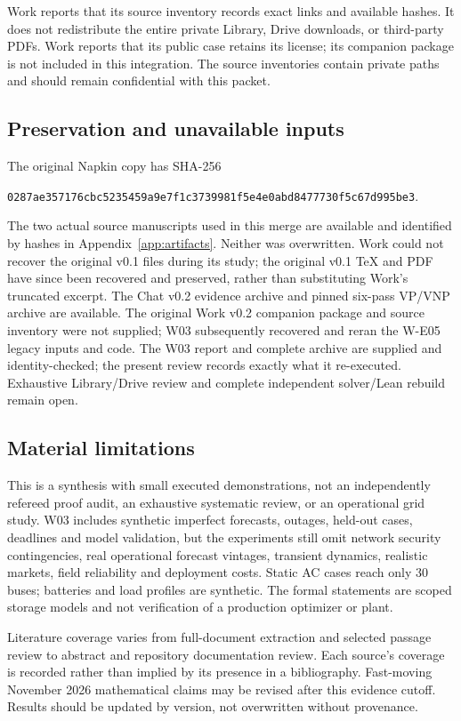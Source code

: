 \documentclass[11pt,letterpaper]{article}
\begin{document}
Work reports that its source inventory records exact links and available hashes. It does not redistribute the entire private Library, Drive downloads, or third-party PDFs. Work reports that its public case retains its license; its companion package is not included in this integration. The source inventories contain private paths and should remain confidential with this packet.

\subsection{Preservation and unavailable inputs}
The original Napkin copy has SHA-256\par\texttt{0287ae357176cbc5235459a9e7f1c37399}\newline\texttt{81f5e4e0abd8477730f5c67d995be3}.\par The two actual source manuscripts used in this merge are available and identified by hashes in Appendix~\ref{app:artifacts}. Neither was overwritten. Work could not recover the original v0.1 files during its study; the original v0.1 TeX and PDF have since been recovered and preserved, rather than substituting Work's truncated excerpt. The Chat v0.2 evidence archive and pinned six-pass VP/VNP archive are available. The original Work v0.2 companion package and source inventory were not supplied; W03 subsequently recovered and reran the W-E05 legacy inputs and code. The W03 report and complete archive are supplied and identity-checked; the present review records exactly what it re-executed. Exhaustive Library/Drive review and complete independent solver/Lean rebuild remain open.

\subsection{Material limitations}
This is a synthesis with small executed demonstrations, not an independently refereed proof audit, an exhaustive systematic review, or an operational grid study. W03 includes synthetic imperfect forecasts, outages, held-out cases, deadlines and model validation, but the experiments still omit network security contingencies, real operational forecast vintages, transient dynamics, realistic markets, field reliability and deployment costs. Static AC cases reach only 30 buses; batteries and load profiles are synthetic. The formal statements are scoped storage models and not verification of a production optimizer or plant.

Literature coverage varies from full-document extraction and selected passage review to abstract and repository documentation review. Each source's coverage is recorded rather than implied by its presence in a bibliography. Fast-moving November 2026 mathematical claims may be revised after this evidence cutoff. Results should be updated by version, not overwritten without provenance.
\end{document}
